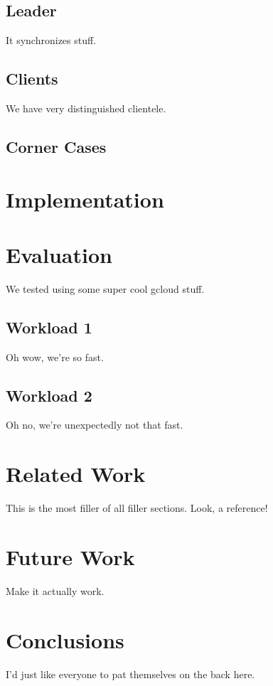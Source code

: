 \documentclass[11pt,english,twocolumn]{article}
\begin{document}
\subsection{Leader}
It synchronizes stuff.

\subsection{Clients}
We have very distinguished clientele.

\subsection{Corner Cases}

\section{Implementation}

\section{Evaluation}
We tested using some super cool gcloud stuff.

\subsection{Workload 1}
Oh wow, we're so fast.

\subsection{Workload 2}
Oh no, we're unexpectedly not that fast.

\section{Related Work}
This is the most filler of all filler sections. Look, a reference! \cite{dynamo}

\section{Future Work}
Make it actually work.

\section{Conclusions}
I'd just like everyone to pat themselves on the back here.

 

\end{document}
